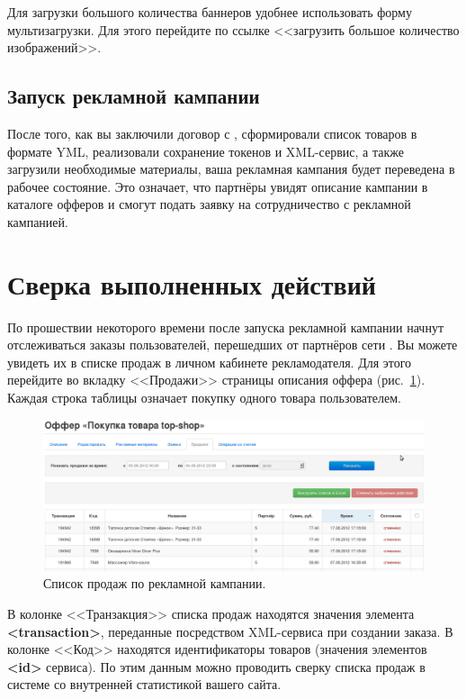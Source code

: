 \documentclass[a4paper,12pt]{article}
\begin{document}
Для загрузки большого количества баннеров удобнее использовать форму мультизагрузки. Для этого перейдите по ссылке <<загрузить большое количество изображений>>.

\subsection{Запуск рекламной кампании}

После того, как вы заключили договор с \heymoose{}, сформировали список товаров в формате YML, реализовали сохранение токенов и XML-сервис, а также загрузили необходимые материалы, ваша рекламная кампания будет переведена в рабочее состояние. Это означает, что партнёры увидят описание кампании в каталоге офферов и смогут подать заявку на сотрудничество с рекламной кампанией.

\section{Сверка выполненных действий}

По прошествии некоторого времени после запуска рекламной кампании начнут отслеживаться заказы пользователей, перешедших от партнёров сети \heymoose{}. Вы можете увидеть их в списке продаж в личном кабинете рекламодателя. Для этого перейдите во вкладку <<Продажи>> страницы описания оффера (рис.~\ref{fig:sales}). Каждая строка таблицы означает покупку одного товара пользователем.

\begin{figure}[!ht]
\centering
\includegraphics[width=\textwidth]{include/sales.png}
\caption{Список продаж по рекламной кампании.}
\label{fig:sales}
\end{figure}

В колонке <<Транзакция>> списка продаж находятся значения элемента \textbf{<transaction>}, переданные посредством XML-сервиса при создании заказа. В колонке <<Код>> находятся идентификаторы товаров (значения элементов \textbf{<id>} сервиса). По этим данным можно проводить сверку списка продаж в системе \heymoose{} со внутренней статистикой вашего сайта.
\end{document}
